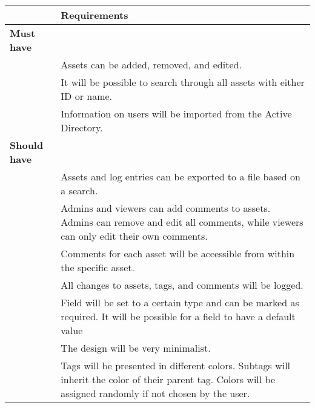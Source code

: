 \begin{table}[H]
    \begin{tabular}{| m{} | p{} |}
        \hline
        & \textbf{Requirements} \\ 
        \hline
        \hline
            \textbf{Must have} & \\ 
            \hline 
            & Assets can be added, removed, and edited. \\ 
            \hline
            & It will be possible to search through all assets with either ID or name. \\ 
            \hline
            & Information on users will be imported from the Active Directory. \\ 
            \hline
            \hline
            
            \textbf{Should have} & \\ 
            \hline
            & Assets and log entries can be exported to a file based on a search. \\ 
            \hline
            & Admins and viewers can add comments to assets. Admins can remove and edit all comments, while viewers can only edit their own comments. \\ 
            \hline
            & Comments for each asset will be accessible from within the specific asset. \\ 
            \hline
            & All changes to assets, tags, and comments will be logged. \\ 
            \hline
            & Field will be set to a certain type and can be marked as required. It will be possible for a field to have a default value \\ 
            \hline
            & The design will be very minimalist. \\ 
            \hline
            & Tags will be presented in different colors. Subtags will inherit the color of their parent tag. Colors will be assigned randomly if not chosen by the user. \\ 
            \hline
            \hline
            

\end{tabular}
\end{table}
